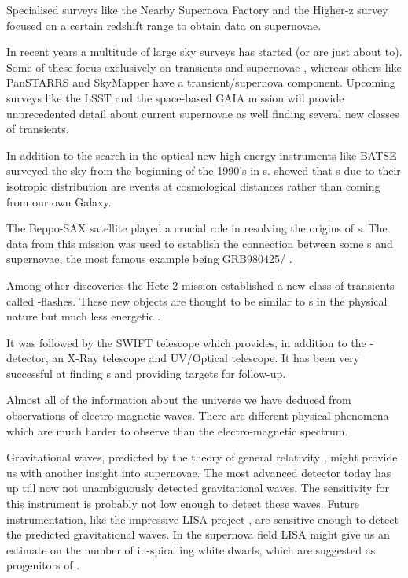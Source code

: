 Specialised surveys like the Nearby Supernova Factory \citep{2002SPIE.4836...61A} and the Higher-z survey \citep{2004ApJ...613..200S} focused on a certain redshift range to obtain data on supernovae.

In recent years a multitude of large sky surveys has started (or are just about to). Some of these focus exclusively on transients and supernovae \citep[e.g. PTF;][]{2009PASP..121.1334R}, whereas others like PanSTARRS \citep{2004SPIE.5489...11K} and SkyMapper \citep{2007PASA...24....1K} have a transient/supernova component. 
Upcoming surveys like the LSST \cite{2006AAS...209.8604P} and the space-based GAIA mission \cite{2001A&A...369..339P} will provide unprecedented detail about current supernovae as well finding several new classes of transients.

In addition to the search in the optical new high-energy instruments like BATSE surveyed the sky from the beginning of the 1990's in \gammaray s. \citet{1992Natur.355..143M} showed that \grb s due to their isotropic distribution are events at cosmological distances rather than coming from our own Galaxy. 

The Beppo-SAX satellite played a crucial role in resolving the origins of \grb s. The data from this mission was used to establish the connection between some \grb s and supernovae, the most famous example being GRB980425/ \citep{1998Natur.395..670G}.

Among other discoveries the Hete-2 mission established a new class of transients called \xray-flashes. These new objects are thought to be similar to  \grb s in the physical nature but much less energetic \citep{2004ApJ...601L.119Z}.  

It was followed by the SWIFT telescope which provides, in addition to the \gammaray-detector, an X-Ray telescope and UV/Optical telescope. It has been very successful at finding \grb s and providing targets for follow-up.

Almost all of the information about the universe we have deduced from observations of electro-magnetic waves. There are different physical phenomena which are much harder to observe than the electro-magnetic spectrum.

Gravitational waves, predicted by the theory of general relativity  \cite{1918SPAW.......154E}, might provide us with another insight into supernovae. The most advanced detector today \cite[LIGO][]{1992Sci...256..325A} has up till now not unambiguously detected gravitational waves. The sensitivity for this instrument is probably not low enough to detect these waves. Future instrumentation, like the impressive LISA-project \citep{1994ESAJ...18..219J}, are sensitive enough to detect the predicted gravitational waves. In the supernova field LISA might give us an estimate on the number of in-spiralling white dwarfs, which are suggested as progenitors of \sneia.


